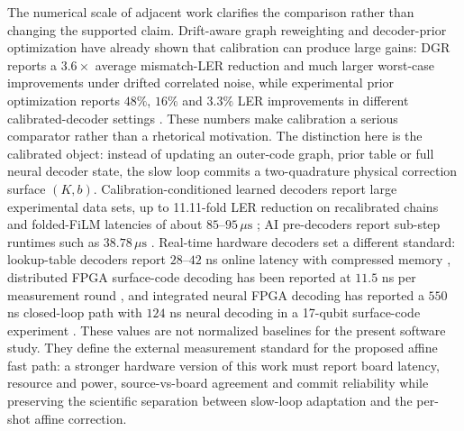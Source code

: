 \documentclass[11pt]{article}
\begin{document}
The numerical scale of adjacent work clarifies the comparison rather than
changing the supported claim.  Drift-aware graph reweighting and decoder-prior
optimization have already shown that calibration can produce large gains:
DGR reports a \(3.6\times\) average mismatch-LER reduction and much larger
worst-case improvements under drifted correlated noise, while experimental
prior optimization reports \(48\%\), \(16\%\) and \(3.3\%\) LER improvements in
different calibrated-decoder settings \cite{dgr2023,sivak2024}.  These numbers
make calibration a serious comparator rather than a rhetorical motivation.
The distinction here is the calibrated object: instead of updating an
outer-code graph, prior table or full neural decoder state, the slow loop
commits a two-quadrature physical correction surface \((K,b)\).  Calibration-conditioned learned decoders report
large experimental data sets, up to 11.11-fold LER reduction on recalibrated
chains and folded-FiLM latencies of about \(85\)--\(95\,\mu\mathrm{s}\)
\cite{stein2026}; AI pre-decoders report sub-step runtimes such as
\(38.78\,\mu\mathrm{s}\) \cite{chamberland2026}.  Real-time hardware decoders
set a different standard: lookup-table decoders report \(28\)--\(42\) ns
online latency with compressed memory \cite{lilliput2022}, distributed FPGA
surface-code decoding has been reported at \(11.5\) ns per measurement round
\cite{helios2023}, and integrated neural FPGA decoding has reported a
\(550\) ns closed-loop path with \(124\) ns neural decoding in a 17-qubit
surface-code experiment \cite{yang2026}.  These values are not normalized
baselines for the present software study.  They define the external measurement
standard for the proposed affine fast path: a stronger hardware version of this
work must report board latency, resource and power, source-vs-board agreement
and commit reliability while preserving the scientific separation between
slow-loop adaptation and the per-shot affine correction.
\end{document}
